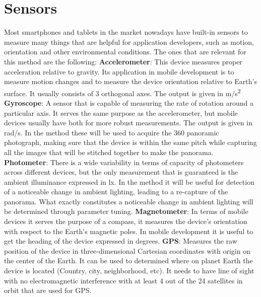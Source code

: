 \section{Sensors}
Most smartphones and tablets in the market nowadays have built-in sensors to measure many things that are helpful for application developers, such as motion, orientation and other environmental conditions. The ones that are relevant for this method are the following:\newline
\textbf{Accelerometer}: This device measures proper acceleration relative to gravity. Its application in mobile development is to measure motion changes and to measure the device orientation relative to Earth's surface. It usually consists of 3 orthogonal axes. The output is given in m/s\textsuperscript{2} \newline
\textbf{Gyroscope}: A sensor that is capable of measuring the rate of rotation around a particular axis. It serves the same purpose as the accelerometer, but mobile devices usually have both for more robust measurements. The output is given in rad/s. In the method these will be used to acquire the 360 panoramic photograph, making sure that the device is within the same pitch while capturing all the images that will be stitched together to make the panorama. \newline
\textbf{Photometer}: There is a wide variability in terms of capacity of photometers across different devices, but the only measurement that is guaranteed is the ambient illuminance expressed in lx.  In the method it will be useful for detection of a noticeable change in ambient lighting, leading to a re-capture of the panorama. What exactly constitutes a noticeable change in ambient lighting will be determined through parameter tuning. \newline 
\textbf{Magnetometer}: In terms of mobile devices it serves the purpose of a compass, it measures the device's orientation with respect to the Earth's magnetic poles. In mobile development it is useful to get the heading of the device expressed in degrees.\newline
\textbf{GPS}: Measures the raw position of the device in three-dimensional Cartesian coordinates with origin on the center of the Earth. It can be used to determined where on planet Earth the device is located (Country, city, neighborhood, etc). It needs to have line of sight with no electromagnetic interference with at least 4 out of the 24 satellites in orbit that are used for GPS.

